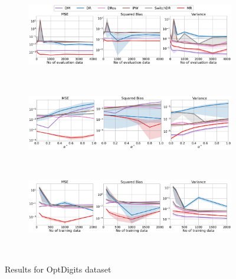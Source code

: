 \begin{figure}[h!]
    \centering
	\begin{subfigure}{0.8\textwidth}
	    \centering
	    \includegraphics[width=1\textwidth]{figures/mr/multiclass/ope_vs_n_alphatar_0_2_optdigits_ntr1000.png}
	    \label{subfig:opt-neval}
	\end{subfigure}\\
	\begin{subfigure}{0.8\textwidth} 
	    \centering
	    \includegraphics[width=1\textwidth]{figures/mr/multiclass/ope_vs_alphatar_neval_1000_optdigits_ntr_1000.png}
	    \label{subfig:opt-ae}
	\end{subfigure}\\
    \begin{subfigure}{0.8\textwidth} 
	    \centering
	    \includegraphics[width=1\textwidth]{figures/mr/multiclass/ope_vs_ntr_neval_1000_optdigits_alpha_0_6.png}
	    \label{subfig:opt-ntr}
	\end{subfigure}\\
    \caption{Results for OptDigits dataset}
    \label{fig:optdigits}
\end{figure}

